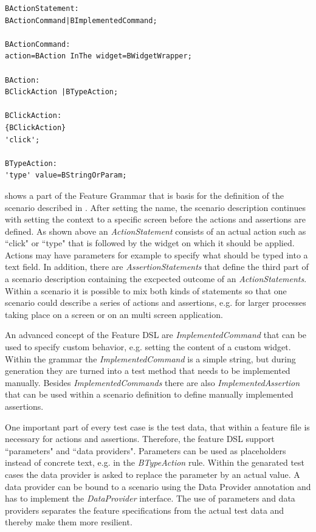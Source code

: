 \documentclass{sig-alternate-05-2015}
\begin{document}
{\begin{lstlisting}[captionpos=b, caption=Feature Grammar, label={lst:featureGrammar}, language=xtext]
BActionStatement:
BActionCommand|BImplementedCommand;

BActionCommand:
action=BAction InThe widget=BWidgetWrapper;

BAction:
BClickAction |BTypeAction;

BClickAction:
{BClickAction}
'click';

BTypeAction:
'type' value=BStringOrParam;
\end{lstlisting}

 shows a part of the Feature Grammar that is basis for the definition of the scenario described in .
After setting the name, the scenario description continues with setting the context to a specific screen before the actions and assertions are defined.
As shown above an \textit{ActionStatement} consists of an actual action such as ``click" or ``type" that is followed by the widget on which it should be applied.
Actions may have parameters for example to specify what should be typed into a text field. 
In addition, there are \textit{AssertionStatements} that define the third part of a scenario description containing the excpected outcome of an \textit{ActionStatements}.
Within a scenario it is possible to mix both kinds of statements so that one scenario could describe a series of actions and assertions, e.g. for larger processes taking place on a screen or on an multi screen application.   

An advanced concept of the Feature DSL are \textit{ImplementedCommand} that can be used to specify custom behavior, e.g. setting the content of a custom widget.
Within the grammar the \textit{ImplementedCommand} is a simple string, but during generation they are turned into a test method that needs to be implemented manually. 
Besides \textit{ImplementedCommands} there are also  \textit{ImplementedAssertion} that can be used within a scenario definition to define manually implemented assertions.

One important part of every test case is the test data, that within a feature file is necessary for actions and assertions.
Therefore, the feature DSL support ``parameters" and ``data providers".
Parameters can be used as placeholders instead of concrete text, e.g. in the \textit{BTypeAction} rule.
Within the genarated test cases the data provider is asked to replace the parameter by an actual value.
A data provider can be bound to a scenario using the Data Provider annotation and has to implement the \textit{DataProvider} interface.
The use of parameters and data providers separates the feature specifications from the actual test data and thereby make them more resilient.

}
\end{document}

